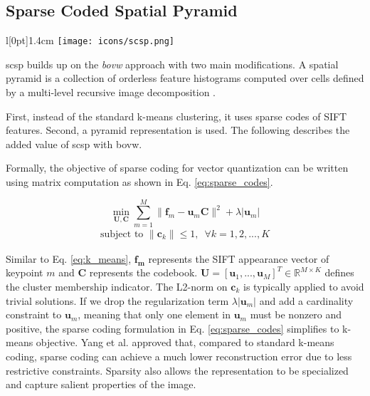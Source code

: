 \subsection{Sparse Coded Spatial Pyramid} \label{scp}
\begingroup
\setlength\intextsep{0pt}
\begin{wrapfigure}[4]{l}[0pt]{1.4cm}
\texttt{[image: icons/scsp.png]}
\end{wrapfigure}

\gls{scsp} builds up on the \textit{bovw} approach with two main modifications.
A spatial pyramid is a collection of orderless feature histograms computed over cells defined by a multi-level recursive image decomposition \cite{lazebnik09}.

First, instead of the standard k-means clustering, it uses sparse codes of SIFT features.
Second, a pyramid representation is used.
The following describes the added value of \gls{scsp} with \gls{bovw}.

Formally, the objective of sparse coding for vector quantization can be written using matrix computation as shown in Eq. \ref{eq:sparse_codes}.

\begin{equation}
  \min_{\boldsymbol{U,C}} \sum_{m=1}^M \|\boldsymbol{f}_m - \boldsymbol{u}_m \boldsymbol{C}\|^2 + \lambda |\boldsymbol{u}_m|
  \label{eq:sparse_codes} 
\end{equation}
\begin{align*}
  \textrm{subject to } \|\boldsymbol{c}_k\| \leq 1, \hspace{6pt} \forall{k} = 1,2,...,K
\end{align*}

Similar to Eq. \ref{eq:k_means}, $\boldsymbol{f_m}$ represents the SIFT appearance vector of keypoint $m$ and $\boldsymbol{C}$ represents the codebook. $\boldsymbol{U} = [\boldsymbol{u}_1,...,\boldsymbol{u}_M]^T \in \mathbb{R}^{M \times K}$ defines the cluster membership indicator. The L2-norm on $\boldsymbol{c}_k$ is typically applied to avoid trivial solutions. If we drop the regularization term $\lambda |\boldsymbol{u}_m|$ and add a cardinality constraint to $\boldsymbol{u}_m$, meaning that only one element in $\boldsymbol{u}_m$ must be nonzero and positive, the sparse coding formulation in Eq. \ref{eq:sparse_codes} simplifies to k-means objective. Yang et al. \cite{yang09} approved that, compared to standard k-means coding, sparse coding can achieve a much lower reconstruction error due to less restrictive constraints. Sparsity also allows the representation to be specialized and capture salient properties of the image.

